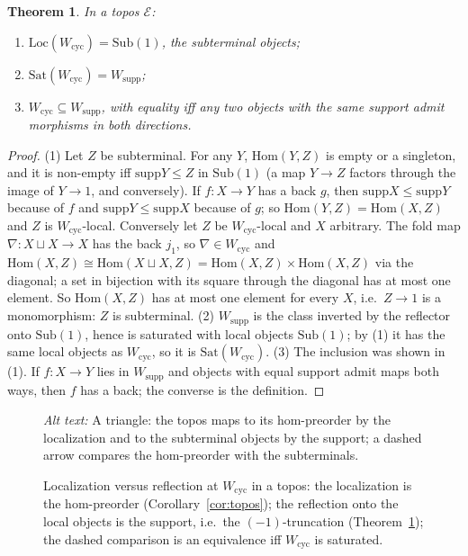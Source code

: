 \documentclass[11pt]{amsart}
\newtheorem{thm}{Theorem}[section]
\theoremstyle{definition}
\newcommand{\Hom}{\mathrm{Hom}}
\newcommand{\Ob}{\mathrm{Ob}}
\newcommand{\Loc}{\mathrm{Loc}}
\newcommand{\Sat}{\mathrm{Sat}}
\newcommand{\supp}{\mathrm{supp}}
\newcommand{\Wcyc}{W_{\mathrm{cyc}}}
\newcommand{\Wsupp}{W_{\mathrm{supp}}}
\newcommand{\Sub}{\mathrm{Sub}}
\begin{document}
\begin{thm}\label{thm:topos}
In a topos $\mathcal E$:
\begin{enumerate}
\item $\Loc(\Wcyc)=\Sub(1)$, the subterminal objects;
\item $\Sat(\Wcyc)=\Wsupp$;
\item $\Wcyc\subseteq\Wsupp$, with equality iff any two objects with the
same support admit morphisms in both directions.
\end{enumerate}
\end{thm}
\begin{proof}
(1) Let $Z$ be subterminal. For any $Y$, $\Hom(Y,Z)$ is empty or a singleton,
and it is non-empty iff $\supp Y\le Z$ in $\Sub(1)$ (a map $Y\to Z$ factors
through the image of $Y\to1$, and conversely). If $f\colon X\to Y$ has a back
$g$, then $\supp X\le\supp Y$ because of $f$ and $\supp Y\le\supp X$ because of
$g$; so $\Hom(Y,Z)=\Hom(X,Z)$ and $Z$ is $\Wcyc$-local. Conversely let $Z$ be
$\Wcyc$-local and $X$ arbitrary. The fold map $\nabla\colon X\sqcup X\to X$
has the back $j_1$, so $\nabla\in\Wcyc$ and $\Hom(X,Z)\cong\Hom(X\sqcup X,Z)
=\Hom(X,Z)\times\Hom(X,Z)$ via the diagonal; a set in bijection with its
square through the diagonal has at most one element. So $\Hom(X,Z)$ has at
most one element for every $X$, i.e.\ $Z\to1$ is a monomorphism: $Z$ is
subterminal.
(2) $\Wsupp$ is the class inverted by the reflector onto $\Sub(1)$, hence is
saturated with local objects $\Sub(1)$; by (1) it has the same local objects
as $\Wcyc$, so it is $\Sat(\Wcyc)$.
(3) The inclusion was shown in (1). If $f\colon X\to Y$ lies in $\Wsupp$ and
objects with equal support admit maps both ways, then $f$ has a back; the
converse is the definition.
\end{proof}

\begin{figure}[ht]
\centering
{}
\caption{Localization versus reflection at $\Wcyc$ in a topos: the
localization is the hom-preorder (Corollary~\ref{cor:topos}); the reflection
onto the local objects is the support, i.e.\ the $(-1)$-truncation
(Theorem~\ref{thm:topos}); the dashed comparison is an equivalence iff
$\Wcyc$ is saturated.}
\label{fig:topos}
\par\smallskip\noindent\textit{Alt text:} A triangle: the topos maps to its
hom-preorder by the localization and to the subterminal objects by the
support; a dashed arrow compares the hom-preorder with the subterminals.
\end{figure}
\end{document}
